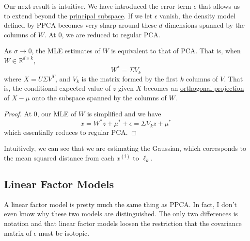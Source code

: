   Our next result is intuitive. We have introduced the error term $\epsilon$ that allows us to extend beyond the \hyperref[def:principal-subspace]{principal subspace}. If we let $\epsilon$ vanish, the density model defined by PPCA becomes very sharp around these $d$ dimensions spanned by the columns of $W$. At $0$, we are reduced to regular PCA. 

  \begin{theorem}
    \label{thm:ppca-as-sigmato0}
 
    As $\sigma \rightarrow 0$, the MLE estimates of $W$ is equivalent to that of PCA. That is, when $W \in \mathbb{R}^{d \times k}$, 
    \begin{equation}
      W^\ast = \Sigma V_k
    \end{equation} 
    where $X = U \Sigma V^T$, and $V_k$ is the matrix formed by the first $k$ columns of $V$. That is, the conditional expected value of $z$ given $X$ becomes an \hyperref[lin-def:orthogonal-projection]{orthogonal projection} of $X - \mu$ onto the subspace spanned by the columns of $W$. 
  \end{theorem}
  \begin{proof}
    At $0$, our MLE of $W$ is simplified and we have 
    \begin{equation}
      x = W^\ast z + \mu^\ast + \epsilon = \Sigma V_k z + \mu^\ast
    \end{equation}
    which essentially reduces to regular PCA. 
  \end{proof}

  Intuitively, we can see that we are estimating the Gaussian, which corresponds to the mean squared distance from each $x^{(i)}$ to $\ell_k$. 

\subsection{Linear Factor Models} 

  A linear factor model is pretty much the same thing as PPCA. In fact, I don't even know why these two models are distinguished. The only two differences is notation and that linear factor models loosen the restriction that the covariance matrix of $\epsilon$ must be isotopic. 

